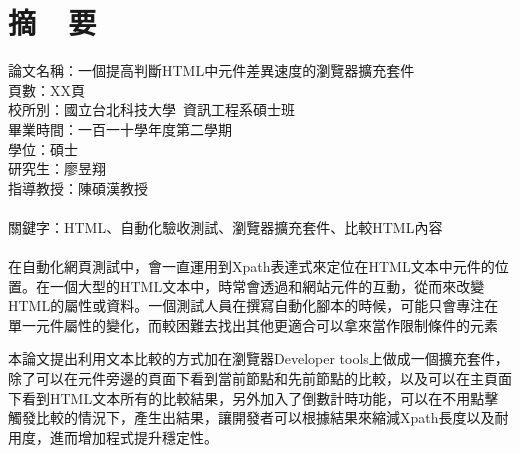 \chapter*{摘~~要}


\noindent
論文名稱：一個提高判斷HTML中元件差異速度的瀏覽器擴充套件\\
頁數：XX頁\\
校所別：國立台北科技大學~資訊工程系碩士班\\
畢業時間：一百一十學年度第二學期\\
學位：碩士\\
研究生：廖昱翔\\
指導教授：陳碩漢教授\\
\hspace*{\fill}\\
\noindent
關鍵字：HTML、自動化驗收測試、瀏覽器擴充套件、比較HTML內容\\
\hspace*{\fill}\\
%
\indent
在自動化網頁測試中，會一直運用到Xpath表達式來定位在HTML文本中元件的位置。在一個大型的HTML文本中，時常會透過和網站元件的互動，從而來改變HTML的屬性或資料。一個測試人員在撰寫自動化腳本的時候，可能只會專注在單一元件屬性的變化，而較困難去找出其他更適合可以拿來當作限制條件的元素

本論文提出利用文本比較的方式加在瀏覽器Developer tools上做成一個擴充套件，除了可以在元件旁邊的頁面下看到當前節點和先前節點的比較，以及可以在主頁面下看到HTML文本所有的比較結果，另外加入了倒數計時功能，可以在不用點擊觸發比較的情況下，產生出結果，讓開發者可以根據結果來縮減Xpath長度以及耐用度，進而增加程式提升穩定性。